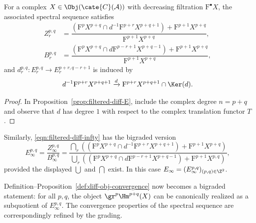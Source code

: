 \begin{proposition}\label{prop:filtered-cplx-ss}
	For a complex $X\in\Obj(\cate{C}(\mathcal{A}))$ with decreasing filtration
	$\mathrm{F}^\bullet X$, the associated spectral sequence satisfies
	\begin{align*}
		Z_r^{p,q}&=
		\dfrac{\left(\mathrm{F}^pX^{p+q}\cap
		d^{-1}\mathrm{F}^{p+r}X^{p+q+1}\right)+\mathrm{F}^{p+1}X^{p+q}}
		{\mathrm{F}^{p+1}X^{p+q}}, \\
		B_r^{p,q}&=
		\dfrac{\left(\mathrm{F}^pX^{p+q}\cap
		d\mathrm{F}^{p-r+1}X^{p+q-1}\right)+\mathrm{F}^{p+1}X^{p+q}}
		{\mathrm{F}^{p+1}X^{p+q}},
	\end{align*}
	and $d_r^{p,q}:E_r^{p,q}\to E_r^{p+r,q-r+1}$ is induced by
	\[ d^{-1}\mathrm{F}^{p+r}X^{p+q+1}\xrightarrow{d}
	\mathrm{F}^{p+r}X^{p+q+1}\cap\Ker(d). \]
\end{proposition}
\begin{proof}
	In Proposition~\ref{prop:filtered-diff-E}, include the complex degree
	$n=p+q$ and observe that $d$ has degree $1$ with respect to the complex
	translation functor $T$.
\end{proof}

Similarly, \eqref{eqn:filtered-diff-infty} has the bigraded version
\begin{equation}\label{eqn:filtered-cplx-infty}
	E_\infty^{p,q}=\dfrac{Z_\infty^{p,q}}{B_\infty^{p,q}}
	=\dfrac{\bigcap_r\left((\mathrm{F}^pX^{p+q}\cap
	d^{-1}\mathrm{F}^{p+r}X^{p+q+1})+\mathrm{F}^{p+1}X^{p+q}\right)}
	{\bigcup_r\left((\mathrm{F}^pX^{p+q}\cap
	d\mathrm{F}^{p-r+1}X^{p+q-1})+\mathrm{F}^{p+1}X^{p,q}\right)},
\end{equation}
provided the displayed $\bigcup$ and $\bigcap$ exist. In this case
$E_\infty=(E_\infty^{p,q})_{(p,q)\in\Z^2}$.

Definition--Proposition~\ref{def:diff-obj-convergence} now becomes a bigraded
statement: for all $p,q$, the object $\gr^p\Hm^{p+q}(X)$ can be canonically
realized as a subquotient of $E_\infty^{p,q}$. The convergence properties of
the spectral sequence are correspondingly refined by the grading.

